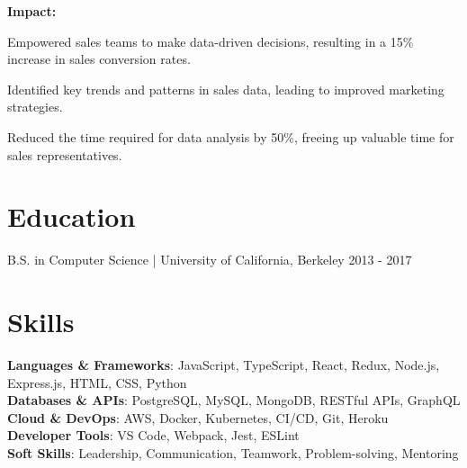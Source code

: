 \documentclass[margin,line]{resume}
\begin{document}
\begin{resume}
\begin{description}
\textbf{Impact:}
\begin{list2}
\item Empowered sales teams to make data-driven decisions, resulting in a 15\% increase in sales conversion rates.
\item Identified key trends and patterns in sales data, leading to improved marketing strategies.
\item Reduced the time required for data analysis by 50\%, freeing up valuable time for sales representatives.
\end{list2}
\end{description}

\section{Education}
\begin{description}
\item[B.S. in Computer Science | University of California, Berkeley \hfill 2013 - 2017]
\end{description}

\section{Skills}
\textbf{Languages \& Frameworks}: JavaScript, TypeScript, React, Redux, Node.js, Express.js, HTML, CSS, Python \\
\textbf{Databases \& APIs}: PostgreSQL, MySQL, MongoDB, RESTful APIs, GraphQL \\
\textbf{Cloud \& DevOps}: AWS, Docker, Kubernetes, CI/CD, Git, Heroku \\
\textbf{Developer Tools}: VS Code, Webpack, Jest, ESLint \\
\textbf{Soft Skills}: Leadership, Communication, Teamwork, Problem-solving, Mentoring

\end{resume}
\end{document}

